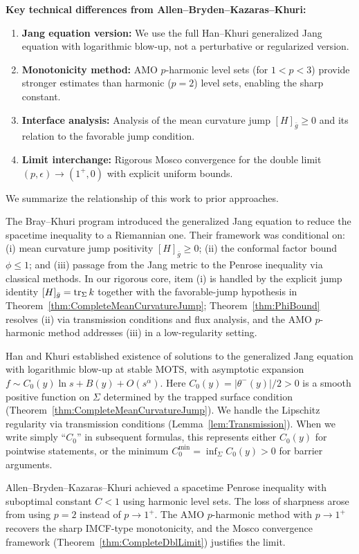 \noindent\textbf{Key technical differences from Allen--Bryden--Kazaras--Khuri:}
\begin{enumerate}
    \item \textbf{Jang equation version:} We use the full Han--Khuri generalized Jang equation with logarithmic blow-up, not a perturbative or regularized version.
    \item \textbf{Monotonicity method:} AMO $p$-harmonic level sets (for $1 < p < 3$) provide stronger estimates than harmonic ($p=2$) level sets, enabling the sharp constant.
    \item \textbf{Interface analysis:} Analysis of the mean curvature jump $[H]_{\bar{g}} \ge 0$ and its relation to the favorable jump condition.
    \item \textbf{Limit interchange:} Rigorous Mosco convergence for the double limit $(p, \epsilon) \to (1^+, 0)$ with explicit uniform bounds.
\end{enumerate}

\begin{remark}\label{rem:GapAnalysis}
We summarize the relationship of this work to prior approaches.

The Bray--Khuri program \cite{braykhuri2010} introduced the generalized Jang equation to reduce the spacetime inequality to a Riemannian one. Their framework was conditional on: (i) mean curvature jump positivity $[H]_{\bar{g}} \ge 0$; (ii) the conformal factor bound $\phi \le 1$; and (iii) passage from the Jang metric to the Penrose inequality via classical methods. In our rigorous core, item (i) is handled by the explicit jump identity $[H]_{\bar{g}}=\operatorname{tr}_\Sigma k$ together with the favorable-jump hypothesis in Theorem~\ref{thm:CompleteMeanCurvatureJump}; Theorem~\ref{thm:PhiBound} resolves (ii) via transmission conditions and flux analysis, and the AMO $p$-harmonic method addresses (iii) in a low-regularity setting.

Han and Khuri \cite{hankhuri2013} established existence of solutions to the generalized Jang equation with logarithmic blow-up at stable MOTS, with asymptotic expansion $f \sim C_0(y) \ln s + B(y) + O(s^\alpha)$. Here $C_0(y) = |\theta^-(y)|/2 > 0$ is a smooth positive function on $\Sigma$ determined by the trapped surface condition (Theorem~\ref{thm:CompleteMeanCurvatureJump}). We handle the Lipschitz regularity via transmission conditions (Lemma~\ref{lem:Transmission}). When we write simply ``$C_0$'' in subsequent formulas, this represents either $C_0(y)$ for pointwise statements, or the minimum $C_0^{\min} = \inf_\Sigma C_0(y) > 0$ for barrier arguments.

Allen--Bryden--Kazaras--Khuri \cite{allenbrydenkazaraskhuri2025} achieved a spacetime Penrose inequality with suboptimal constant $C < 1$ using harmonic level sets. The loss of sharpness arose from using $p = 2$ instead of $p \to 1^+$. The AMO $p$-harmonic method with $p \to 1^+$ recovers the sharp IMCF-type monotonicity, and the Mosco convergence framework (Theorem~\ref{thm:CompleteDblLimit}) justifies the limit.
\end{remark}

